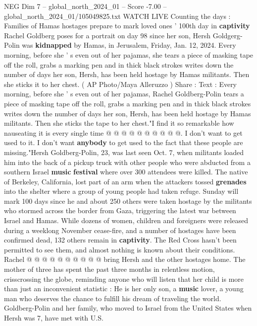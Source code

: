 \begin{textsample}{NEG Dim 7 – global\_north\_2024\_01 – Score -7.00 – global\_north\_2024\_01/105049825.txt}  \label{ex:f7_neg_209}
WATCH LIVE Counting the days : Families of Hamas hostages prepare to mark loved ones ' 100th day in \textbf{captivity} Rachel Goldberg poses for a portrait on day 98 since her son, Hersh Goldgerg-Polin was \textbf{kidnapped} by Hamas, in Jerusalem, Friday, Jan. 12, 2024.
Every morning, before she ' s even out of her pajamas, she tears a piece of masking tape off the roll, grabs a marking pen and in thick black strokes writes down the number of days her son, Hersh, has been held hostage by Hamas militants.
Then she sticks it to her chest. ( AP Photo/Maya Alleruzzo ) Share : Text : Every morning, before she ' s even out of her pajamas, Rachel Goldberg-Polin tears a piece of masking tape off the roll, grabs a marking pen and in thick black strokes writes down the number of days her son, Hersh, has been held hostage by Hamas militants.
Then she sticks the tape to her chest."I find it so remarkable how nauseating it is every single time @ @ @ @ @ @ @ @ @ @.
I don't want to get used to it.
I don't want \textbf{anybody} to get used to the fact that these people are missing."Hersh Goldberg-Polin, 23, was last seen Oct. 7, when militants loaded him into the back of a pickup truck with other people who were abducted from a southern Israel \textbf{music} \textbf{festival} where over 300 attendees were killed.
The native of Berkeley, California, lost part of an arm when the attackers tossed \textbf{grenades} into the shelter where a group of young people had taken refuge.
Sunday will mark 100 days since he and about 250 others were taken hostage by the militants who stormed across the border from Gaza, triggering the latest war between Israel and Hamas.
While dozens of women, children and foreigners were released during a weeklong November cease-fire, and a number of hostages have been confirmed dead, 132 others remain in \textbf{captivity}.
The Red Cross hasn't been permitted to see them, and almost nothing is known about their conditions.
Rachel @ @ @ @ @ @ @ @ @ @ bring Hersh and the other hostages home.
The mother of three has spent the past three months in relentless motion, crisscrossing the globe, reminding anyone who will listen that her child is more than just an inconvenient statistic : He is her only son, a \textbf{music} lover, a young man who deserves the chance to fulfill his dream of traveling the world.
Goldberg-Polin and her family, who moved to Israel from the United States when Hersh was 7, have met with U.S.

\end{textsample}
